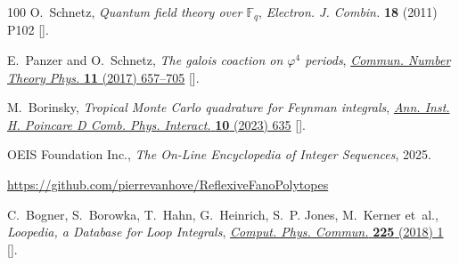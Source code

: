 \documentclass[12pt,a4paper]{article}
\theoremstyle{plain}
\theoremstyle{remark}
\begin{document}
\begin{thebibliography}{100}
O.~Schnetz, \emph{Quantum field theory over $\mathbb{F}_q$}, {\emph{Electron.
  J. Combin.} {\bfseries 18} (2011) P102}
  [\href{https://arxiv.org/abs/0909.0905}{{}}].

E.~Panzer and O.~Schnetz, \emph{The galois coaction on $\varphi^4$ periods},
  \href{https://doi.org/10.4310/CNTP.2017.v11.n3.a3}{\emph{Commun. Number
  Theory Phys.} {\bfseries 11} (2017) 657–705}
  [\href{https://arxiv.org/abs/1603.04289}{{}}].

M.~Borinsky, \emph{{Tropical Monte Carlo quadrature for Feynman integrals}},
  \href{https://doi.org/10.4171/aihpd/158}{\emph{Ann. Inst. H. Poincare D Comb.
  Phys. Interact.} {\bfseries 10} (2023) 635}
  [\href{https://arxiv.org/abs/2008.12310}{{}}].

{OEIS Foundation Inc.}, \emph{The {O}n-{L}ine {E}ncyclopedia of {I}nteger
  {S}equences},  2025.

\url{https://github.com/pierrevanhove/ReflexiveFanoPolytopes}

C.~Bogner, S.~Borowka, T.~Hahn, G.~Heinrich, S.~P. Jones, M.~Kerner et~al.,
  \emph{{Loopedia, a Database for Loop Integrals}},
  \href{https://doi.org/10.1016/j.cpc.2017.12.017}{\emph{Comput. Phys. Commun.}
  {\bfseries 225} (2018) 1} [\href{https://arxiv.org/abs/1709.01266}{{}}].
  
\end{thebibliography}\endgroup
\end{document}
